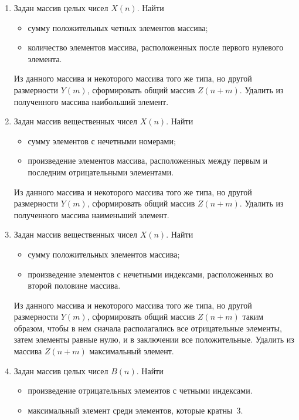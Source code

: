 \begin{enumerate}
\item Задан массив целых чисел $X(n)$. Найти
\begin{itemize}
\item сумму положительных четных элементов массива;
\item количество элементов массива, расположенных после первого нулевого элемента.
\end{itemize}

Из данного массива и некоторого массива того же типа, но другой размерности $Y(m)$,
сформировать общий массив $Z(n+m)$. Удалить из полученного массива наибольший
элемент.
\item Задан массив вещественных чисел $X(n)$. Найти
\begin{itemize}
\item сумму элементов с нечетными номерами;
\item произведение элементов массива, расположенных между первым и последним отрицательными элементами.
\end{itemize}
Из данного массива и некоторого массива того же типа, но другой размерности $Y(m)$,
сформировать общий массив $Z(n+m)$. Удалить из полученного массива наименьший
элемент.
\item Задан массив вещественных чисел $X(n)$. Найти
\begin{itemize}
\item сумму положительных элементов массива;
\item произведение элементов с нечетными индексами, расположенных во второй половине массива. 
\end{itemize}
Из данного массива и некоторого массива того же типа, но другой размерности $Y(m)$,
сформировать общий массив $Z(n+m)$ таким образом, чтобы в нем сначала располагались
все отрицательные элементы, затем элементы равные нулю, и в заключении все положительные. Удалить из массива
$Z(n+m)$ максимальный элемент.
\item Задан массив целых чисел $B(n)$. Найти
\begin{itemize}
\item произведение отрицательных элементов с четными индексами.
\item максимальный элемент среди элементов, которые кратны~3.
\end{itemize}


\end{enumerate}

